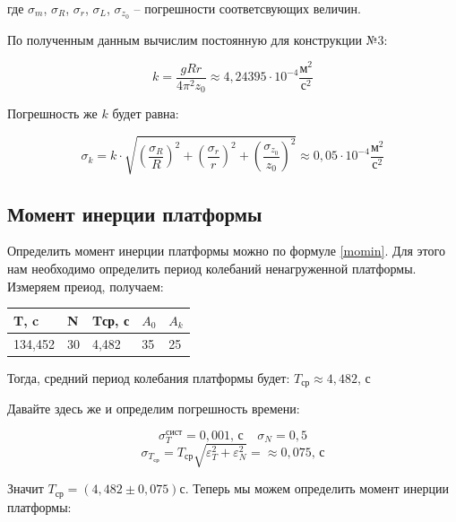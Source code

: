 \documentclass[a4paper,14pt]{extarticle}
\begin{document}
	\noindent где $\sigma_m$, $\sigma_R$, $\sigma_r$, $\sigma_L$, $\sigma_{z_0}$ -- погрешности соответсвующих величин.
	
	\bigskip
	
	По полученным данным вычислим постоянную для конструкции №3:
	
	\begin{equation}
		k = \frac{gRr}{4\pi^2z_0} \approx 4,24395\cdot 10^{-4} \frac{\text{м}^2}{\text{с}^2}
	\end{equation}
	
	Погрешность же $k$ будет равна:
	
	\begin{equation}
		\sigma_k = k \cdot \sqrt{\left( \frac{\sigma_R}{R}\right)^2 + \left( \frac{\sigma_r}{r}\right)^2 + \left( \frac{\sigma_{z_0}}{z_0}\right)^2} \approx 0,05 \cdot 10^{-4} \frac{\text{м}^2}{\text{с}^2}
	\end{equation}
	
	\subsection{Момент инерции платформы}
	
	Определить момент инерции платформы можно по формуле \eqref{momin}. Для этого нам необходимо определить период колебаний ненагруженной платформы. Измеряем преиод, получаем:
	
	\begin{table}[!ht]
		\begin{center}
			\begin{tabular}{|l|l|l|l|l|}
				\hline
				 T, c & N & Tср, с & $A_0$ & $A_k$ \\ \hline
			     134,452 & 30 & 4,482 & 35 & 25 \\ \hline
			\end{tabular}
		\end{center}
	\end{table}
	
	Тогда, средний период колебания платформы будет: $T_\text{ср} \approx 4,482\text{, с}$
	
	Давайте здесь же и определим погрешность времени: 
	
    $$\sigma_T^{\text{сист}} = 0,001\text{, с}\;\;\;\;\sigma_N = 0,5$$
	$$\sigma_{T_\text{ср}} = T_\text{ср}\sqrt{\varepsilon_T^{2} + \varepsilon_{N}^{2}} =\approx 0,075\text{, с}$$

	Значит $T_\text{ср} = \left(4,482 \pm 0,075\right)\text{с}$. Теперь мы можем определить момент инерции платформы:
	
\end{document}

